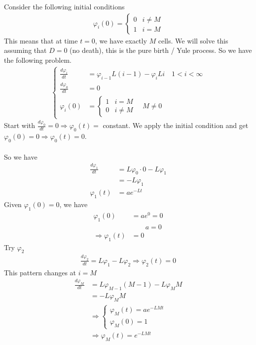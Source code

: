 \documentclass[12pt, letterpaper]{article}
\begin{document}
Consider the following initial conditions 
\begin{align*}
    \varphi_i(0) = \begin{cases}
        0 & i \ne M \\
        1 & i = M 
    \end{cases}
\end{align*}
This means that at time $t = 0$, we have exactly $M$ cells. We will solve this assuming that 
$D = 0$ (no death), this is the pure birth / Yule process. So we have the following problem.
\begin{align*}
    \begin{cases}
        \displaystyle\frac{d\varphi_i}{dt} &= \varphi_{i-1}L(i-1) -\varphi_i Li \quad 1 < i < \infty \\
        \displaystyle\frac{d\varphi_0}{dt} &= 0 \\
        \varphi_i(0) &= \begin{cases}
            1 & i = M \\
            0 & i \ne M
        \end{cases} \quad M \ne 0
    \end{cases}
\end{align*}
Start with $\frac{d\varphi_0}{dt} = 0 \Rightarrow \varphi_0(t) = $ constant. We apply the 
initial condition and get $\varphi_0(0) = 0 \Rightarrow \varphi_0(t) = 0$. \\ \\
So we have 
\begin{align*}
    \frac{d\varphi_1}{dt} &= L\varphi_0\cdot 0-L\varphi_1 \\
    &= -L\varphi_1 \\
    \varphi_1(t) &= ae^{-Lt}
\end{align*}
Given $\varphi_1(0) = 0$, we have
\begin{align*}
    \varphi_1(0) &= ae^{0} = 0\\
    &\qquad a = 0 \\
    \Rightarrow \varphi_1(t) &= 0
\end{align*}
Try $\varphi_2$
\begin{align*}
    \frac{d\varphi_2}{dt} = L\varphi_1 - L\varphi_2 \Rightarrow \varphi_2(t) = 0
\end{align*}
This pattern changes at $i = M$
\begin{align*}
    \frac{d\varphi_M}{dt} &= L\varphi_{M-1}(M-1) - L\varphi_M M \\
    &= -L\varphi_M M \\
    &\Rightarrow \begin{cases}
        \varphi_M (t) = ae^{-LMt} \\
        \varphi_M (0) = 1
    \end{cases} \\
    &\Rightarrow \varphi_M(t) = e^{-LMt}
\end{align*}
\end{document}
